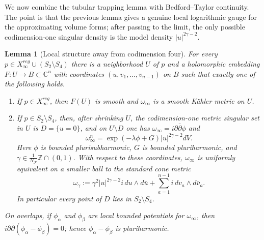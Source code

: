 \documentclass[11pt]{amsart}
\newtheorem{lemma}[theorem]{Lemma}
\theoremstyle{definition}
\theoremstyle{remark}
\begin{document}
We now combine the tubular trapping lemma with Bedford--Taylor continuity. The
point is that the previous lemma gives a genuine local logarithmic gauge for the
approximating volume forms; after passing to the limit, the only possible
codimension-one singular density is the model density $|u|^{2\gamma-2}$.

\begin{lemma}[Local structure away from codimension four]
\label{lem:local-structure}
For every $p\in X_\infty^{reg}\cup(S_2\setminus S_4)$ there is a
neighborhood $U$ of $p$ and a holomorphic embedding
$F:U\to B\subset\mathbb C^n$ with coordinates $(u,v_1,\dots,v_{n-1})$ on $B$
such that exactly one of the following holds.

\begin{enumerate}
\item If $p\in X_\infty^{reg}$, then $F(U)$ is smooth and $\omega_\infty$ is a
smooth K\"ahler metric on $U$.

\item If $p\in S_2\setminus S_4$, then, after shrinking $U$, the codimension-one
metric singular set in $U$ is $D=\{u=0\}$, and on $U\setminus D$ one has
$\omega_\infty=i\partial\bar\partial\phi$ and
\[
        \omega_\infty^n
        =
        \exp(-\lambda\phi+G)|u|^{2\gamma-2}dV .
\]
Here $\phi$ is bounded plurisubharmonic, $G$ is bounded pluriharmonic, and
$\gamma\in \frac1{N_{\mathcal F}}\mathbb Z\cap(0,1)$. With respect to these
coordinates, $\omega_\infty$ is uniformly equivalent on a smaller ball to the
standard cone metric
\[
        \omega_\gamma
        :=
        \gamma^2 |u|^{2\gamma-2}i\,du\wedge d\bar u
        +
        \sum_{a=1}^{n-1}i\,dv_a\wedge d\bar v_a .
\]
In particular every point of $D$ lies in $S_2\setminus S_4$.
\end{enumerate}

On overlaps, if $\phi_\alpha$ and $\phi_\beta$ are local bounded potentials for
$\omega_\infty$, then $i\partial\bar\partial(\phi_\alpha-\phi_\beta)=0$; hence
$\phi_\alpha-\phi_\beta$ is pluriharmonic.
\end{lemma}
\end{document}
